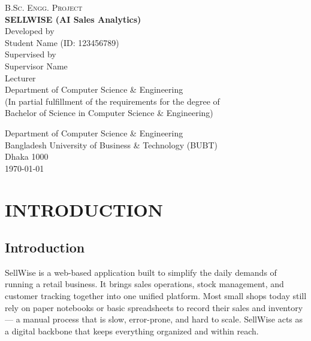 \documentclass[12pt,a4paper]{report}
\begin{document}
\begin{titlepage}
    \centering
    \vspace*{1cm}
    
    {\Large \textsc{B.Sc. Engg. Project}}\\[1.5cm]
    
    {\huge \textbf{SELLWISE (AI Sales Analytics)}}\\[1.5cm]
    
    {\Large Developed by}\\[0.5cm]
    {\large Student Name (ID: 123456789)}\\[1.5cm]
    
    {\Large Supervised by}\\[0.5cm]
    {\large Supervisor Name}\\[0.2cm]
    {\large Lecturer}\\[1.5cm]
    
    {\Large Department of Computer Science \& Engineering}\\[0.5cm]
    {\large (In partial fulfillment of the requirements for the degree of\\
    Bachelor of Science in Computer Science \& Engineering)}\\[1.5cm]
    
    \vfill
    
    {\Large Department of Computer Science \& Engineering}\\[0.5cm]
    {\Large Bangladesh University of Business \& Technology (BUBT)}\\[0.5cm]
    {\Large Dhaka 1000}\\[0.5cm]
    {\large \today}
\end{titlepage}

\tableofcontents
\newpage
\listoffigures
\newpage
{}

\chapter{INTRODUCTION}
\section{Introduction}
SellWise is a web-based application built to simplify the daily demands of running a retail business. It brings sales operations, stock management, and customer tracking together into one unified platform. Most small shops today still rely on paper notebooks or basic spreadsheets to record their sales and inventory — a manual process that is slow, error-prone, and hard to scale. SellWise acts as a digital backbone that keeps everything organized and within reach.
\end{document}
